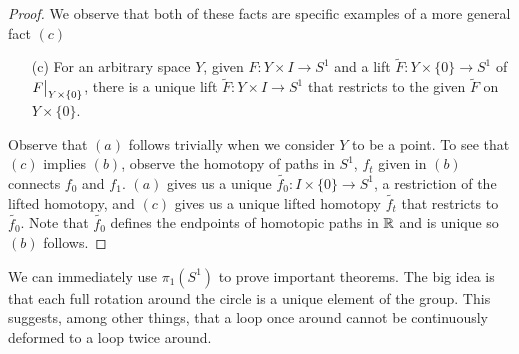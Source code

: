 \documentclass[10pt]{article}
\newcommand\restr[2]{{%
  \left.\kern-\nulldelimiterspace %
  #1 %
  \vphantom{\big|} %
  \right|_{#2} %
}}
\begin{document}
\begin{proof}
We observe that both of these facts are specific examples of a more general fact $(c)$

\begin{itemize}
	\item[(c)] For an arbitrary space $Y$, given $F: Y \times I \to S^1$ and a lift $\tilde{F}: Y \times \{0\} \to S^1$ of $\restr{F}{Y \times \{0\}}$, there is a unique lift $\tilde{F}: Y \times I \to S^1$ that restricts to the given $\tilde{F}$ on $Y \times \{0\}$.
\end{itemize}

Observe that $(a)$ follows trivially when we consider $Y$ to be a point. 
To see that $(c)$ implies $(b)$, observe the homotopy of paths in $S^1$, $f_t$ given in $(b)$ connects $f_0$ and $f_1$. $(a)$ gives us a unique $\tilde{f_0}: I \times \{0\} \to S^1$, a restriction of the lifted homotopy, and $(c)$ gives us a unique lifted homotopy $\tilde{f_t}$ that restricts to $\tilde{f_0}$. Note that $\tilde{f_0}$ defines the endpoints of homotopic paths in $\mathbb{R}$ and is unique so $(b)$ follows.

% 
% 
% 

\end{proof}

We can immediately use $\pi_1(S^1)$ to prove important theorems. The big idea is that each full rotation around the circle is a unique element of the group. This suggests, among other things, that a loop once around cannot be continuously deformed to a loop twice around.
\end{document}
